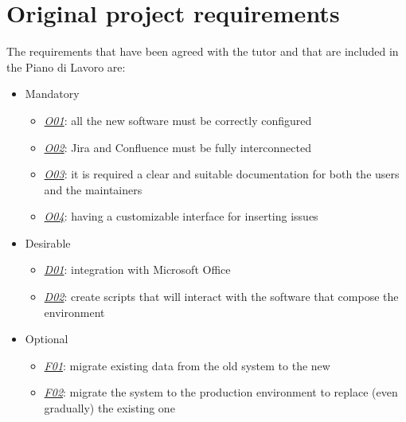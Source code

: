 \section{Original project requirements}
	The requirements that have been agreed with the tutor and that are included in the Piano di Lavoro are:
	\begin{itemize}
		\item Mandatory
		\begin{itemize}
			\item \underline{\textit{O01}}: all the new software must be correctly configured
			\item \underline{\textit{O02}}: Jira and Confluence must be fully interconnected
			\item \underline{\textit{O03}}: it is required a clear and suitable documentation for both the users and the maintainers
			\item \underline{\textit{O04}}: having a customizable interface for inserting issues
		\end{itemize}
		\item Desirable
		\begin{itemize}
			\item \underline{\textit{D01}}: integration with Microsoft Office
			\item \underline{\textit{D02}}: create scripts that will interact with the software that compose the environment
		\end{itemize}
		\item Optional
		\begin{itemize}
			\item \underline{\textit{F01}}: migrate existing data from the old system to the new
			\item \underline{\textit{F02}}: migrate the system to the production environment to replace (even gradually) the existing one
		\end{itemize} 
	\end{itemize}

\newpage
